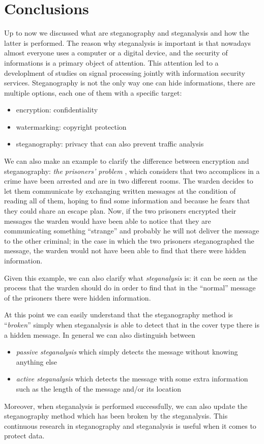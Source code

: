 \documentclass[../../main.tex]{subfiles}
\begin{document}
\section{Conclusions}

Up to now we discussed what are steganography and steganalysis and how the
latter is performed. The reason why steganalysis is important is that nowadays
almost everyone uses a computer or a digital device, and the security of
informations is a primary object of attention. This attention led to a
developlment of studies on signal processing jointly with information security
services. Steganography is not the only way one can hide informations, there are
multiple options, each one of them with a specific target:

\begin{itemize}[noitemsep]
    \item encryption: confidentiality
    \item watermarking: copyright protection
    \item steganography: privacy that can also prevent traffic analysis
\end{itemize}

We can also make an example to clarify the difference between encryption and
steganography: \emph{the prisoners' problem} \cite{prisoners-problem}, which
considers that two accomplices in a crime have been arrested and are in two
different rooms. The warden decides to let them communicate by exchanging
written messages at the condition of reading all of them, hoping to find some
information and because he fears that they could share an escape plan. Now, if
the two prisoners encrypted their messages the warden would have been able to
notice that they are communicating something ``strange'' and probably he will
not deliver the message to the other criminal; in the case in which the two
prisoners steganographed the message, the warden would not have been able to
find that there were hidden information.

Given this example, we can also clarify what \emph{steganalysis} is: it can be
seen as the process that the warden should do in order to find that in the
``normal'' message of the prisoners there were hidden information.

At this point we can easily understand that the steganography method is
``\emph{broken}'' simply when steganalysis is able to detect that in the cover
type there is a hidden message. In general we can also distinguish between

\begin{itemize}[noitemsep]
    \item \emph{passive steganalysis} which simply detects the message without
          knowing anything else
    \item \emph{active steganalysis} which detects the message with some extra
          information such as the length of the message and/or its location
\end{itemize}

Moreover, when steganalysis is performed successfully, we can also update the
steganography method which has been broken by the steganalysis. This continuous
research in steganography and steganalysis is useful when it comes to protect
data. \cite{review-audio-steganalysis}
\end{document}
